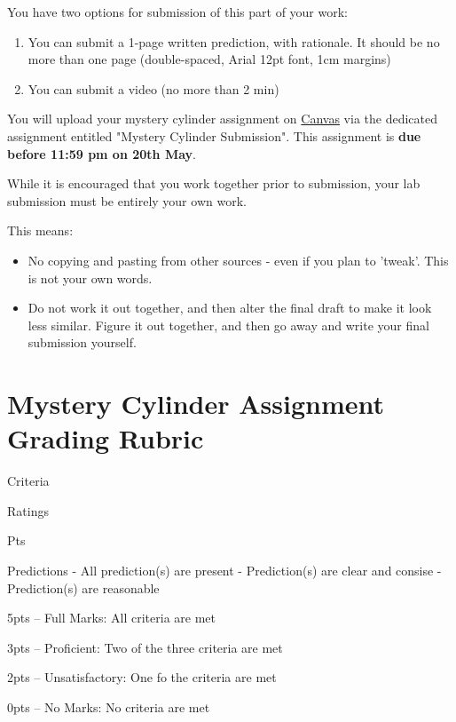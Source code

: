 \documentclass[
]{book}
\providecommand{\tightlist}{%
  \setlength{\itemsep}{0pt}\setlength{\parskip}{0pt}}
\begin{document}
You have two options for submission of this part of your work:

\begin{enumerate}
\def\labelenumi{\arabic{enumi}.}
\tightlist
\item
  You can submit a 1-page written prediction, with rationale. It should be no more than one page (double-spaced, Arial 12pt font, 1cm margins)
\item
  You can submit a video (no more than 2 min)
\end{enumerate}

You will upload your mystery cylinder assignment on \href{https://canvas.ubc.ca}{Canvas} via the dedicated assignment entitled "Mystery Cylinder Submission". This assignment is \textbf{due before 11:59 pm on 20th May}.

While it is encouraged that you work together prior to submission, your lab submission must be entirely your own work.

This means:

\begin{itemize}
\tightlist
\item
  No copying and pasting from other sources - even if you plan to 'tweak'. This is not your own words.
\item
  Do not work it out together, and then alter the final draft to make it look less similar. Figure it out together, and then go away and write your final submission yourself.
\end{itemize}

\hypertarget{mystery-cylinder-assignment-grading-rubric}{%
\section*{Mystery Cylinder Assignment Grading Rubric}\label{mystery-cylinder-assignment-grading-rubric}}

Criteria

Ratings

Pts

Predictions
- All prediction(s) are present
- Prediction(s) are clear and consise
- Prediction(s) are reasonable

5pts -- Full Marks: All criteria are met

3pts -- Proficient: Two of the three criteria are met

2pts -- Unsatisfactory: One fo the criteria are met

0pts -- No Marks: No criteria are met
\end{document}
